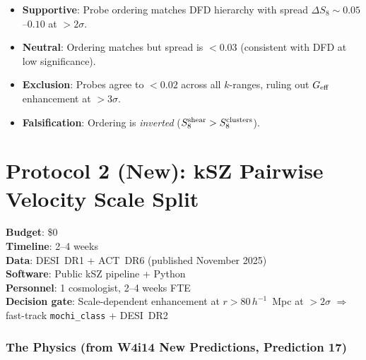 \documentclass[11pt]{article}
\newcommand{\Geff}{G_{\rm eff}}
\begin{document}
\begin{itemize}[nosep]
\item \textbf{Supportive}: Probe ordering matches DFD hierarchy with
  spread $\Delta S_8 \sim 0.05$--$0.10$ at $> 2\sigma$.
\item \textbf{Neutral}: Ordering matches but spread is $< 0.03$
  (consistent with DFD at low significance).
\item \textbf{Exclusion}: Probes agree to $< 0.02$ across all
  $k$-ranges, ruling out $\Geff$ enhancement at $> 3\sigma$.
\item \textbf{Falsification}: Ordering is \emph{inverted}
  ($S_8^{\rm shear} > S_8^{\rm clusters}$).
\end{itemize}


\part{Protocol 2 (New): kSZ Pairwise Velocity Scale Split}
\label{part:ksz}

\begin{tcolorbox}[colback=green!3!white, colframe=actioncolor,
  title=\textbf{PROTOCOL 2N: kSZ VELOCITY SCALE SPLIT --- READY TO EXECUTE}]
\textbf{Budget}: \$0\\
\textbf{Timeline}: 2--4 weeks\\
\textbf{Data}: DESI~DR1 + ACT~DR6 (published November 2025)\\
\textbf{Software}: Public kSZ pipeline + Python\\
\textbf{Personnel}: 1 cosmologist, 2--4 weeks FTE\\
\textbf{Decision gate}: Scale-dependent enhancement at $r > 80\,h^{-1}$~Mpc
  at $> 2\sigma$ $\Rightarrow$ fast-track \texttt{mochi\_class} + DESI~DR2
\end{tcolorbox}

\section{The Physics (from W4i14 New Predictions, Prediction 17)}
\end{document}
